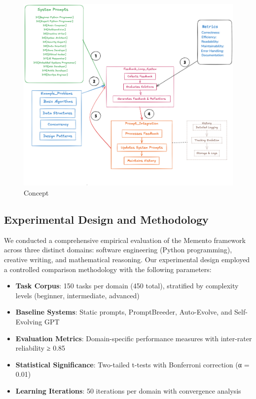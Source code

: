\documentclass[10pt,a4paper,twocolumn]{article}
\begin{document}
\begin{figure}
    \centering
    \includegraphics[width=1\linewidth]{concept.png}
    \caption{Concept}
    \label{concept}
\end{figure}








\subsection{Experimental Design and Methodology}

We conducted a comprehensive empirical evaluation of the Memento framework across three distinct domains: software engineering (Python programming), creative writing, and mathematical reasoning. Our experimental design employed a controlled comparison methodology with the following parameters:

\begin{itemize}
    \item \textbf{Task Corpus}: 150 tasks per domain (450 total), stratified by complexity levels (beginner, intermediate, advanced)
\item \textbf{Baseline Systems}: Static prompts, PromptBreeder, Auto-Evolve, and Self-Evolving GPT
\item \textbf{Evaluation Metrics}: Domain-specific performance measures with inter-rater reliability ≥ 0.85
\item \textbf{Statistical Significance}: Two-tailed t-tests with Bonferroni correction (α = 0.01)
\item \textbf{Learning Iterations}: 50 iterations per domain with convergence analysis
\end{itemize}
\end{document}
